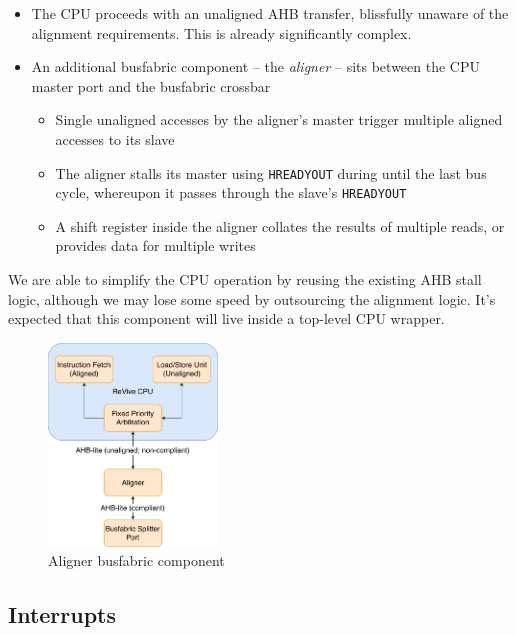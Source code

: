 \documentclass{article}
\begin{document}
\begin{itemize}
	\item The CPU proceeds with an unaligned AHB transfer, blissfully unaware of the alignment requirements. This is already significantly complex.
	\item An additional busfabric component -- the \textit{aligner} -- sits between the CPU master port and the busfabric crossbar
	\begin{itemize}
		\item Single unaligned accesses by the aligner's master trigger multiple aligned accesses to its slave
		\item The aligner stalls its master using \texttt{HREADYOUT} during until the last bus cycle, whereupon it passes through the slave's \texttt{HREADYOUT}
		\item A shift register inside the aligner collates the results of multiple reads, or provides data for multiple writes
	\end{itemize}
\end{itemize}

We are able to simplify the CPU operation by reusing the existing AHB stall logic, although we may lose some speed by outsourcing the alignment logic. It's expected that this component will live inside a top-level CPU wrapper.

\begin{figure}[!htb]
\centering
\label{diagram:unaligned_accesses}
\caption{Aligner busfabric component}
\includegraphics[width=0.4\textwidth]{diagrams/unaligned_accesses.pdf}
\end{figure}

\subsection{Interrupts}
\end{document}
